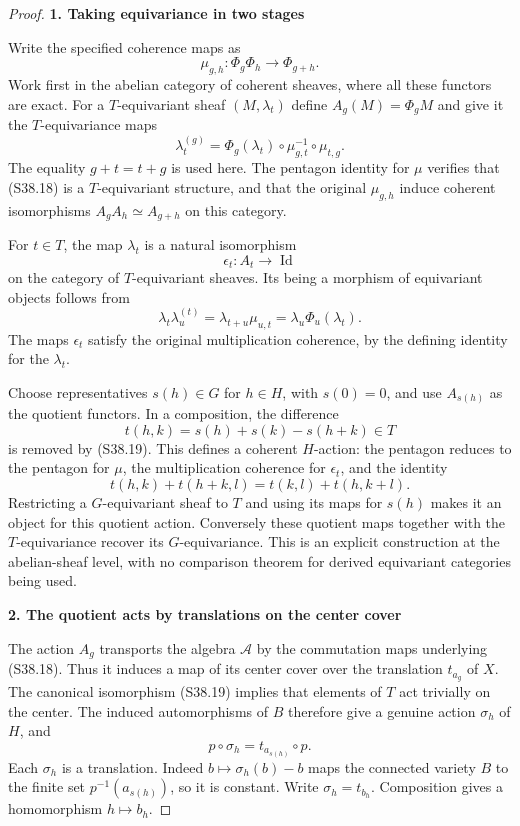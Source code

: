 \documentclass[11pt,a4paper]{article}
\theoremstyle{definition}
\begin{document}
\begin{proof}
\par

\medskip\noindent\textbf{1. Taking equivariance in two stages}\quad

Write the specified coherence maps as \[
 \mu_{g,h}:\Phi_g\Phi_h\longrightarrow\Phi_{g+h}.
\] Work first in the abelian category of coherent sheaves, where all these functors are exact. For a \(T\)-equivariant sheaf \((M,\lambda_t)\) define \(A_g(M)=\Phi_gM\) and give it the \(T\)-equivariance maps \[
 \lambda_t^{(g)}
  =\Phi_g(\lambda_t)\circ\mu_{g,t}^{-1}\circ\mu_{t,g}.
 \tag{S38.18}
\] The equality \(g+t=t+g\) is used here. The pentagon identity for \(\mu\) verifies that (S38.18) is a \(T\)-equivariant structure, and that the original \(\mu_{g,h}\) induce coherent isomorphisms \(A_gA_h\simeq A_{g+h}\) on this category.

For \(t\in T\), the map \(\lambda_t\) is a natural isomorphism \[
 \epsilon_t:A_t\longrightarrow\operatorname{Id}
 \tag{S38.19}
\] on the category of \(T\)-equivariant sheaves. Its being a morphism of equivariant objects follows from \[
 \lambda_t\lambda_u^{(t)}
    =\lambda_{t+u}\mu_{u,t}
    =\lambda_u\Phi_u(\lambda_t).
\] The maps \(\epsilon_t\) satisfy the original multiplication coherence, by the defining identity for the \(\lambda_t\).

Choose representatives \(s(h)\in G\) for \(h\in H\), with \(s(0)=0\), and use \(A_{s(h)}\) as the quotient functors. In a composition, the difference \[
 t(h,k)=s(h)+s(k)-s(h+k)\in T
\] is removed by (S38.19). This defines a coherent \(H\)-action: the pentagon reduces to the pentagon for \(\mu\), the multiplication coherence for \(\epsilon_t\), and the identity \[
 t(h,k)+t(h+k,l)=t(k,l)+t(h,k+l).
\] Restricting a \(G\)-equivariant sheaf to \(T\) and using its maps for \(s(h)\) makes it an object for this quotient action. Conversely these quotient maps together with the \(T\)-equivariance recover its \(G\)-equivariance. This is an explicit construction at the abelian-sheaf level, with no comparison theorem for derived equivariant categories being used.

\par

\medskip\noindent\textbf{2. The quotient acts by translations on the center cover}\quad

The action \(A_g\) transports the algebra \(\mathscr A\) by the commutation maps underlying (S38.18). Thus it induces a map of its center cover over the translation \(t_{a_g}\) of \(X\). The canonical isomorphism (S38.19) implies that elements of \(T\) act trivially on the center. The induced automorphisms of \(B\) therefore give a genuine action \(\sigma_h\) of \(H\), and \[
 p\circ\sigma_h=t_{a_{s(h)}}\circ p.
 \tag{S38.20}
\] Each \(\sigma_h\) is a translation. Indeed \(b\mapsto\sigma_h(b)-b\) maps the connected variety \(B\) to the finite set \(p^{-1}(a_{s(h)})\), so it is constant. Write \(\sigma_h=t_{b_h}\). Composition gives a homomorphism \(h\mapsto b_h\).


\end{proof}
\end{document}
